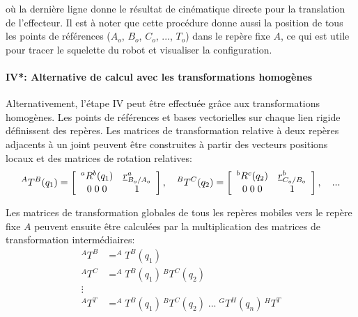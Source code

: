 où la dernière ligne donne le résultat de cinématique directe pour la translation de l'effecteur. Il est à noter que cette procédure donne aussi la position de tous les points de références ($A_o$, $B_o$, $C_o$, ..., $T_o$) dans le repère fixe $A$, ce qui est utile pour tracer le squelette du robot et visualiser la configuration.


\paragraph{IV*: Alternative de calcul avec les transformations homogènes}

Alternativement, l'étape IV peut être effectuée grâce aux transformations homogènes. Les points de références et bases vectorielles sur chaque lien rigide définissent des repères. Les matrices de transformation relative à deux repères adjacents à un joint peuvent être construites à partir des vecteurs positions locaux et des matrices de rotation relatives: 
\begin{align}
^AT^B(q_1) 
= 
\left[ \begin{array}{c c } 
^aR^b(q_1)  & \underline{r}_{B_o/A_o}^a \\ 0 \; 0 \; 0 & 1
\end{array} \right] ,
\quad 
^BT^C(q_2) 
= 
\left[ \begin{array}{c c } 
^bR^c(q_2)  & \underline{r}_{C_o/B_o}^b \\ 0 \; 0 \; 0 & 1
\end{array} \right] ,
\quad 
...
\end{align} 

Les matrices de transformation globales de tous les repères mobiles vers le repère fixe $A$ peuvent ensuite être calculées par la multiplication des matrices de transformation intermédiaires:
\begin{align}
^AT^B &= ^AT^B(q_1) \\
^AT^C &= ^AT^B(q_1) \,  ^BT^C(q_2) \\
\vdots  & \nonumber \\
^AT^T &= ^AT^B(q_1) \,  ^BT^C(q_2) \; ... \; ^GT^H(q_n) \, ^HT^T
\end{align} 

